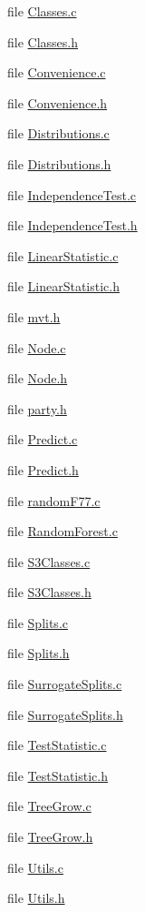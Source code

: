 \begin{CompactItemize}
\item 
file \hyperlink{Classes_8c}{Classes.c}
\item 
file \hyperlink{Classes_8h}{Classes.h}
\item 
file \hyperlink{Convenience_8c}{Convenience.c}
\item 
file \hyperlink{Convenience_8h}{Convenience.h}
\item 
file \hyperlink{Distributions_8c}{Distributions.c}
\item 
file \hyperlink{Distributions_8h}{Distributions.h}
\item 
file \hyperlink{IndependenceTest_8c}{Independence\-Test.c}
\item 
file \hyperlink{IndependenceTest_8h}{Independence\-Test.h}
\item 
file \hyperlink{LinearStatistic_8c}{Linear\-Statistic.c}
\item 
file \hyperlink{LinearStatistic_8h}{Linear\-Statistic.h}
\item 
file \hyperlink{mvt_8h}{mvt.h}
\item 
file \hyperlink{Node_8c}{Node.c}
\item 
file \hyperlink{Node_8h}{Node.h}
\item 
file \hyperlink{party_8h}{party.h}
\item 
file \hyperlink{Predict_8c}{Predict.c}
\item 
file \hyperlink{Predict_8h}{Predict.h}
\item 
file \hyperlink{randomF77_8c}{random\-F77.c}
\item 
file \hyperlink{RandomForest_8c}{Random\-Forest.c}
\item 
file \hyperlink{S3Classes_8c}{S3Classes.c}
\item 
file \hyperlink{S3Classes_8h}{S3Classes.h}
\item 
file \hyperlink{Splits_8c}{Splits.c}
\item 
file \hyperlink{Splits_8h}{Splits.h}
\item 
file \hyperlink{SurrogateSplits_8c}{Surrogate\-Splits.c}
\item 
file \hyperlink{SurrogateSplits_8h}{Surrogate\-Splits.h}
\item 
file \hyperlink{TestStatistic_8c}{Test\-Statistic.c}
\item 
file \hyperlink{TestStatistic_8h}{Test\-Statistic.h}
\item 
file \hyperlink{TreeGrow_8c}{Tree\-Grow.c}
\item 
file \hyperlink{TreeGrow_8h}{Tree\-Grow.h}
\item 
file \hyperlink{Utils_8c}{Utils.c}
\item 
file \hyperlink{Utils_8h}{Utils.h}
\end{CompactItemize}
